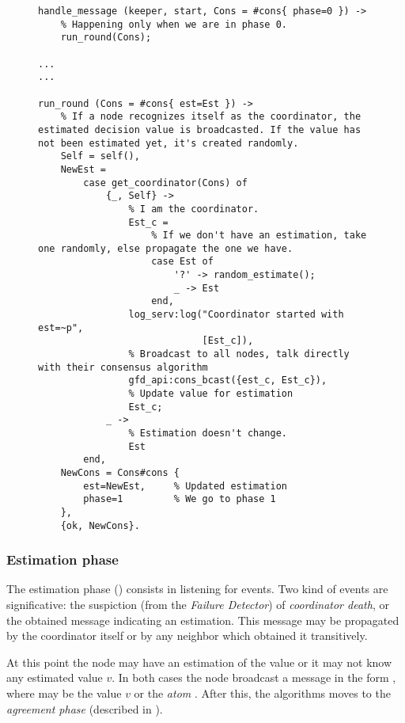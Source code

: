 \begin{figure}[hbt]
\begin{lstlisting}[caption={Startup phase},
                   label={code:ConsStartup}]
handle_message (keeper, start, Cons = #cons{ phase=0 }) ->
    % Happening only when we are in phase 0.
    run_round(Cons);

...
...

run_round (Cons = #cons{ est=Est }) ->
    % If a node recognizes itself as the coordinator, the estimated decision value is broadcasted. If the value has not been estimated yet, it's created randomly.
    Self = self(),
    NewEst =
        case get_coordinator(Cons) of
            {_, Self} ->
                % I am the coordinator.
                Est_c =
                    % If we don't have an estimation, take one randomly, else propagate the one we have.
                    case Est of
                        '?' -> random_estimate();
                        _ -> Est
                    end,
                log_serv:log("Coordinator started with est=~p",
                             [Est_c]),
                % Broadcast to all nodes, talk directly with their consensus algorithm
                gfd_api:cons_bcast({est_c, Est_c}),
                % Update value for estimation
                Est_c;
            _ ->
                % Estimation doesn't change.
                Est
        end,
    NewCons = Cons#cons {
        est=NewEst,     % Updated estimation
        phase=1         % We go to phase 1
    },
    {ok, NewCons}.
\end{lstlisting}
\end{figure}

\subsubsection{Estimation phase} \label{subsub:ConsEstimation}

The estimation phase () consists in listening
for events. Two kind of events are significative: the suspiction (from the
\emph{Failure Detector}) of \emph{coordinator death}, or the obtained
message indicating an estimation. This message may be propagated by the
coordinator itself or by any neighbor which obtained it transitively.

At this point the node may have an estimation of the value or it may not
know any estimated value $v$. In both cases the node broadcast a message
in the form , where  may be the value $v$ or
the \emph{atom} . After this, the algorithms moves to the
\emph{agreement phase} (described in ).

